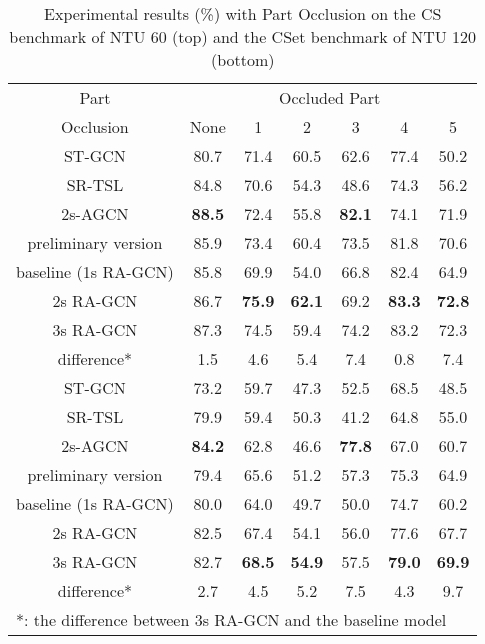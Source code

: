 \documentclass[journal]{IEEEtran}
\begin{document}
\begin{table}[t]
\caption{Experimental results (\%) with Part Occlusion on the CS benchmark of NTU 60 (top) and the CSet benchmark of NTU 120 (bottom)}
\label{tab:part}
\centering
\begin{tabular}{ccccccc}
\hline
Part & \multicolumn{6}{c}{Occluded Part} \\
\cline{2-7}
Occlusion & None & 1 & 2 & 3 & 4 & 5 \\
\hline
\hline
ST-GCN \cite{yan2018spatial} & 80.7 & 71.4 & 60.5 & 62.6 & 77.4 & 50.2 \\
SR-TSL \cite{si2018skeleton} & 84.8 & 70.6 & 54.3 & 48.6 & 74.3 & 56.2 \\
2s-AGCN \cite{shi2019two} & {\bf 88.5} & 72.4 & 55.8 & {\bf 82.1} & 74.1 & 71.9 \\
preliminary version \cite{song2019richly} & 85.9 & 73.4 & 60.4 & 73.5 & 81.8 & 70.6 \\
baseline (1s RA-GCN) & 85.8 & 69.9 & 54.0 & 66.8 & 82.4 & 64.9 \\
2s RA-GCN & 86.7 & {\bf 75.9} & {\bf 62.1} & 69.2 & {\bf 83.3} & {\bf 72.8} \\
3s RA-GCN & 87.3 & 74.5 & 59.4 & 74.2 & 83.2 & 72.3 \\
difference* & 1.5 & 4.6 & 5.4 & 7.4 & 0.8 & 7.4 \\
\hline
\hline
ST-GCN \cite{yan2018spatial} & 73.2 & 59.7 & 47.3 & 52.5 & 68.5 & 48.5 \\
SR-TSL \cite{si2018skeleton} & 79.9 & 59.4 & 50.3 & 41.2 & 64.8 & 55.0 \\
2s-AGCN \cite{shi2019two} & {\bf 84.2} & 62.8 & 46.6 & {\bf 77.8} & 67.0 & 60.7 \\
preliminary version \cite{song2019richly} & 79.4 & 65.6 & 51.2 & 57.3 & 75.3 & 64.9 \\
baseline (1s RA-GCN) & 80.0 & 64.0 & 49.7 & 50.0 & 74.7 & 60.2 \\
2s RA-GCN & 82.5 & 67.4 & 54.1 & 56.0 & 77.6 & 67.7 \\
3s RA-GCN & 82.7 & {\bf 68.5} & {\bf 54.9} & 57.5 & {\bf 79.0} & {\bf 69.9} \\
difference* & 2.7 & 4.5 & 5.2 & 7.5 & 4.3 & 9.7 \\
\hline
\multicolumn{7}{l}{*: the difference between 3s RA-GCN and the baseline model}
\end{tabular}
\vspace{-0.4cm}
\end{table}
\end{document}
